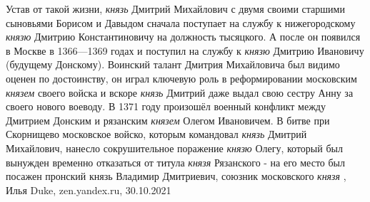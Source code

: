 Устав от такой жизни, \emph{князь} Дмитрий Михайлович с двумя своими старшими
сыновьями Борисом и Давыдом сначала поступает на службу к нижегородскому \emph{князю}
Дмитрию Константиновичу на должность тысяцкого. А после он появился в Москве в
1366—1369 годах и поступил на службу к \emph{князю} Дмитрию Ивановичу (будущему
Донскому). Воинский талант Дмитрия Михайловича был видимо оценен по
достоинству, он играл ключевую роль в реформировании московским \emph{князем} своего
войска и вскоре \emph{князь} Дмитрий даже выдал свою сестру Анну за своего нового
воеводу.  В 1371 году произошёл военный конфликт между Дмитрием Донским и
рязанским \emph{князем} Олегом Ивановичем. В битве при Скорнищево московское войско,
которым командовал \emph{князь} Дмитрий Михайлович, нанесло сокрушительное поражение
\emph{князю} Олегу, который был вынужден временно отказаться от титула \emph{князя}
Рязанского - на его место был посажен пронский князь Владимир Дмитриевич,
союзник московского \emph{князя}
, Илья Duke, zen.yandex.ru, 30.10.2021
